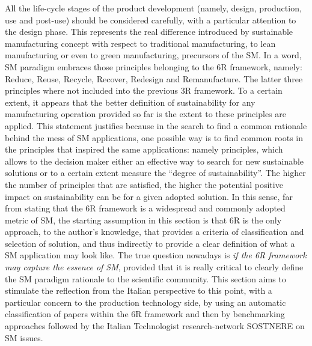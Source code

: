 \documentclass[b5paper,]{book}
\theoremstyle{definition}
\theoremstyle{definition}
\theoremstyle{definition}
\theoremstyle{remark}
\begin{document}
All the life-cycle stages of the product development (namely, design,
production, use and post-use) should be considered carefully, with a
particular attention to the design phase. This represents the real
difference introduced by sustainable manufacturing concept with respect
to traditional manufacturing, to lean manufacturing or even to green
manufacturing, precursors of the SM. In a word, SM paradigm embraces
those principles belonging to the 6R framework, namely: Reduce, Reuse,
Recycle, Recover, Redesign and Remanufacture. The latter three
principles where not included into the previous 3R framework. To a
certain extent, it appears that the better definition of sustainability
for any manufacturing operation provided so far is the extent to these
principles are applied. This statement justifies because in the search
to find a common rationale behind the mess of SM applications, one
possible way is to find common roots in the principles that inspired the
same applications: namely principles, which allows to the decision maker
either an effective way to search for new sustainable solutions or to a
certain extent measure the ``degree of sustainability''. The higher the
number of principles that are satisfied, the higher the potential
positive impact on sustainability can be for a given adopted solution.
In this sense, far from stating that the 6R framework is a widespread
and commonly adopted metric of SM, the starting assumption in this
section is that 6R is the only approach, to the author's knowledge, that
provides a criteria of classification and selection of solution, and
thus indirectly to provide a clear definition of what a SM application
may look like. The true question nowadays is \emph{if the 6R framework
may capture the essence of SM}, provided that it is really critical to
clearly define the SM paradigm rationale to the scientific community.
This section aims to stimulate the reflection from the Italian
perspective to this point, with a particular concern to the production
technology side, by using an automatic classification of papers within
the 6R framework and then by benchmarking approaches followed by the
Italian Technologist research-network SOSTNERE on SM issues.
\end{document}
